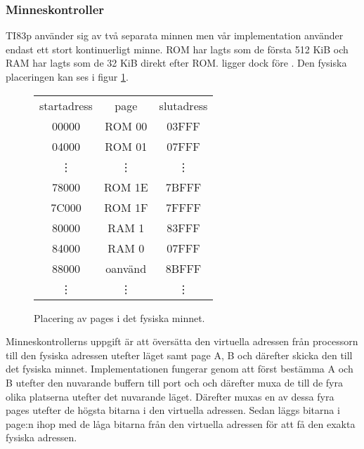 \documentclass[main.tex]{subfiles}
\begin{document}
\subsubsection{Minneskontroller}
TI83p använder sig av två separata minnen men vår implementation använder
endast ett stort kontinuerligt minne. ROM har lagts som de första 512 KiB och
RAM har lagts som de 32 KiB direkt efter ROM.  ligger dock före
. Den fysiska placeringen kan ses i figur \ref{fig:physical}.

\begin{figure}[H]
    \center
    \small\ttfamily\arraybackslash
    \begin{tabular}{c|c|c}
        \multicolumn{1}{c}{\normalfont startadress} &
        \multicolumn{1}{c}{\normalfont page} &
        \multicolumn{1}{c}{\normalfont slutadress} \\ \cline{2-2}
        00000  & ROM 00  & 03FFF \\ \cline{2-2}
        04000  & ROM 01  & 07FFF \\
        \multicolumn{1}{c}{\vdots} &
        \multicolumn{1}{c}{\vdots} & \vdots \\
        78000  & ROM 1E  & 7BFFF \\ \cline{2-2}
        7C000  & ROM 1F  & 7FFFF \\ \cline{2-2}
        80000  & RAM 1   & 83FFF \\ \cline{2-2}
        84000  & RAM 0   & 07FFF \\ \cline{2-2}
        88000  & oanvänd & 8BFFF \\ \cline{2-2}
        \vdots & \vdots  & \vdots \\
    \end{tabular}
    \caption{Placering av pages i det fysiska minnet.}
    \label{fig:physical}
\end{figure}

Minneskontrollerns uppgift är att översätta den virtuella adressen från
processorn till den fysiska adressen utefter läget samt page A, B och därefter
skicka den till det fysiska minnet. Implementationen fungerar genom att först
bestämma A och B utefter den nuvarande buffern till port  och
 och därefter muxa de till de fyra olika platserna utefter det
nuvarande läget. Därefter muxas en av dessa fyra pages utefter de högsta
bitarna i den virtuella adressen. Sedan läggs bitarna i page:n ihop med de låga
bitarna från den virtuella adressen för att få den exakta fysiska adressen.
\end{document}
